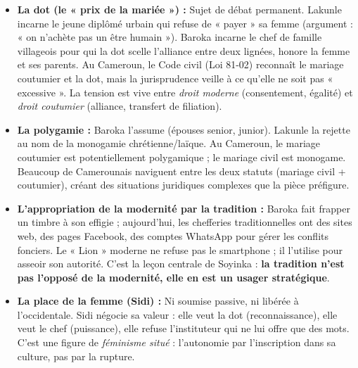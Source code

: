 \documentclass[11pt]{article}
\begin{document}
\begin{savaistu}
\begin{itemize}
    \item \textbf{La dot (le « prix de la mariée ») :} Sujet de débat permanent. Lakunle incarne le jeune diplômé urbain qui refuse de « payer » sa femme (argument : « on n'achète pas un être humain »). Baroka incarne le chef de famille villageois pour qui la dot scelle l'alliance entre deux lignées, honore la femme et ses parents. Au Cameroun, le Code civil (Loi 81-02) reconnaît le mariage coutumier et la dot, mais la jurisprudence veille à ce qu'elle ne soit pas « excessive ». La tension est vive entre \emph{droit moderne} (consentement, égalité) et \emph{droit coutumier} (alliance, transfert de filiation).
    \item \textbf{La polygamie :} Baroka l'assume (épouses senior, junior). Lakunle la rejette au nom de la monogamie chrétienne/laïque. Au Cameroun, le mariage coutumier est potentiellement polygamique ; le mariage civil est monogame. Beaucoup de Camerounais naviguent entre les deux statuts (mariage civil + coutumier), créant des situations juridiques complexes que la pièce préfigure.
    \item \textbf{L'appropriation de la modernité par la tradition :} Baroka fait frapper un timbre à son effigie ; aujourd'hui, les chefferies traditionnelles ont des sites web, des pages Facebook, des comptes WhatsApp pour gérer les conflits fonciers. Le « Lion » moderne ne refuse pas le smartphone ; il l'utilise pour asseoir son autorité. C'est la leçon centrale de Soyinka : \textbf{la tradition n'est pas l'opposé de la modernité, elle en est un usager stratégique}.
    \item \textbf{La place de la femme (Sidi) :} Ni soumise passive, ni libérée à l'occidentale. Sidi négocie sa valeur : elle veut la dot (reconnaissance), elle veut le chef (puissance), elle refuse l'instituteur qui ne lui offre que des mots. C'est une figure de \emph{féminisme situé} : l'autonomie par l'inscription dans sa culture, pas par la rupture.
\end{itemize}
\end{savaistu}
\end{document}
